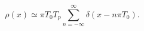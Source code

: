 \begin{equation}
\rho(x)\simeq \pi T_{0}T_{p}\sum_{n=-\infty}^{\infty}\delta(x-n\pi T_{0}).
\end{equation}

